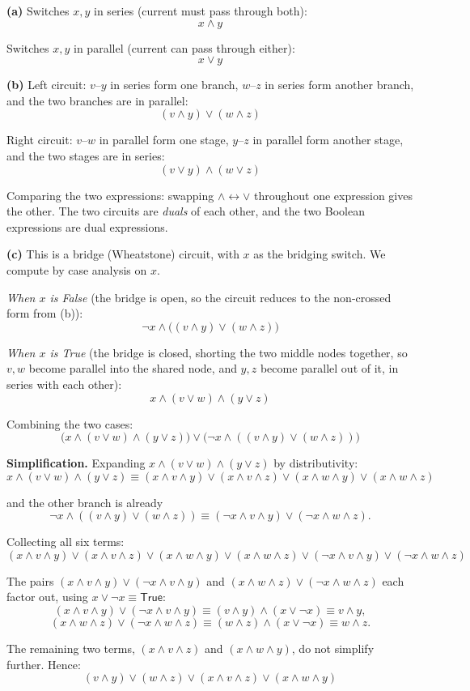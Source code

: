 \begin{solbox}[long]

\begin{solution}
\textbf{(a)} Switches $x,y$ in series (current must pass through both):
\[
x\wedge y
\]

Switches $x,y$ in parallel (current can pass through either):
\[
x\vee y
\]

\bigskip
\textbf{(b)} Left circuit: $v$--$y$ in series form one branch, $w$--$z$ in series form another branch, and the two branches are in parallel:
\[
(v\wedge y)\vee(w\wedge z)
\]

Right circuit: $v$--$w$ in parallel form one stage, $y$--$z$ in parallel form another stage, and the two stages are in series:
\[
(v\vee y)\wedge(w\vee z)
\]

Comparing the two expressions: swapping $\wedge\leftrightarrow\vee$ throughout one expression gives the other. The two circuits are \emph{duals} of each other, and the two Boolean expressions are dual expressions.

\bigskip
\textbf{(c)} This is a bridge (Wheatstone) circuit, with $x$ as the bridging switch. We compute by case analysis on $x$.

\smallskip
\emph{When $x$ is False} (the bridge is open, so the circuit reduces to the non-crossed form from (b)):
\[
\neg x\wedge\big((v\wedge y)\vee(w\wedge z)\big)
\]

\smallskip
\emph{When $x$ is True} (the bridge is closed, shorting the two middle nodes together, so $v,w$ become parallel into the shared node, and $y,z$ become parallel out of it, in series with each other):
\[
x\wedge (v\vee w)\wedge(y\vee z)
\]

\smallskip
Combining the two cases:
\[
\big(x\wedge(v\vee w)\wedge(y\vee z)\big)\vee\big(\neg x\wedge((v\wedge y)\vee(w\wedge z))\big)
\]

\bigskip
\textbf{Simplification.} Expanding $x\wedge(v\vee w)\wedge(y\vee z)$ by distributivity:
\[
x\wedge(v\vee w)\wedge(y\vee z) \equiv (x\wedge v\wedge y)\vee(x\wedge v\wedge z)\vee(x\wedge w\wedge y)\vee(x\wedge w\wedge z)
\]

and the other branch is already
\[
\neg x\wedge((v\wedge y)\vee(w\wedge z)) \equiv (\neg x\wedge v\wedge y)\vee(\neg x\wedge w\wedge z).
\]

Collecting all six terms:
\[
(x\wedge v\wedge y)\vee(x\wedge v\wedge z)\vee(x\wedge w\wedge y)\vee(x\wedge w\wedge z)\vee(\neg x\wedge v\wedge y)\vee(\neg x\wedge w\wedge z)
\]

The pairs $(x\wedge v\wedge y)\vee(\neg x\wedge v\wedge y)$ and $(x\wedge w\wedge z)\vee(\neg x\wedge w\wedge z)$ each factor out, using $x\vee\neg x\equiv\mathsf{True}$:
\[
(x\wedge v\wedge y)\vee(\neg x\wedge v\wedge y)\equiv (v\wedge y)\wedge(x\vee\neg x)\equiv v\wedge y,
\]
\[
(x\wedge w\wedge z)\vee(\neg x\wedge w\wedge z)\equiv (w\wedge z)\wedge(x\vee\neg x)\equiv w\wedge z.
\]

The remaining two terms, $(x\wedge v\wedge z)$ and $(x\wedge w\wedge y)$, do not simplify further. Hence:
\[
(v\wedge y)\vee(w\wedge z)\vee(x\wedge v\wedge z)\vee(x\wedge w\wedge y)
\]
\end{solution}
\end{solbox}

